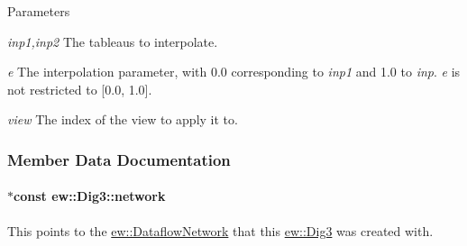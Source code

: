 \begin{DoxyParams}{Parameters}
\item[{\em inp1,inp2}]The tableaus to interpolate. \item[{\em e}]The interpolation parameter, with 0.0 corresponding to {\itshape inp1\/} and 1.0 to {\itshape inp\/}. {\itshape e\/} is not restricted to \mbox{[}0.0, 1.0\mbox{]}. \item[{\em view}]The index of the view to apply it to. \end{DoxyParams}


\subsubsection{Member Data Documentation}
\hypertarget{classew_1_1Dig3_a94c1e034e60f4ca25cff64ee88ca86ab}{
\paragraph[{network}]{ $\ast$const {\bf ew::Dig3::network}}\hfill}
\label{classew_1_1Dig3_a94c1e034e60f4ca25cff64ee88ca86ab}
This points to the \hyperlink{classew_1_1DataflowNetwork}{ew::DataflowNetwork} that this \hyperlink{classew_1_1Dig3}{ew::Dig3} was created with. 